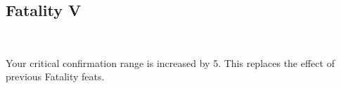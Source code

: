 \subsection*{Fatality V}\label{feat:fatality5}
 \\

Your critical confirmation range is increased by 5. This replaces the effect
of previous Fatality feats.
